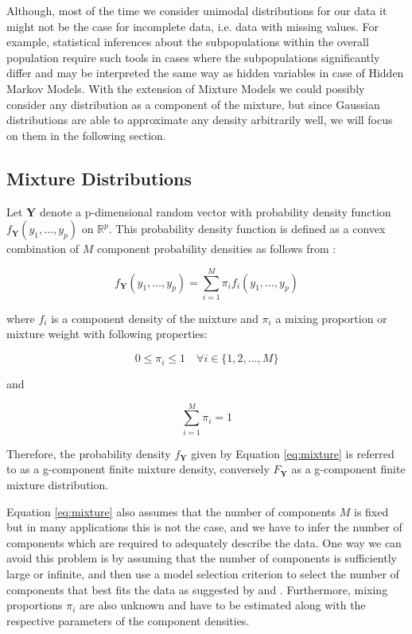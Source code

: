 Although, most of the time we consider unimodal distributions for our data it might not be the case for incomplete data, i.e. data with missing values.
For example, statistical inferences about the subpopulations within the overall population require such tools in cases where the subpopulations significantly differ 
and may be interpreted the same way as hidden variables in case of Hidden Markov Models. With the extension of Mixture Models we could possibly consider any
distribution as a component of the mixture, but since Gaussian distributions are able to approximate any density arbitrarily well, we will focus on them in the following section.

\subsection{Mixture Distributions}

Let $\textbf{Y}$ denote a p-dimensional random vector with probability density function $f_{\textbf{Y}}(y_1,\ldots,y_p)$ on $\mathbb{R}^p$. 
This probability density function is defined as a convex combination of $M$ component probability densities as follows from \citep{McLachlan2000}: 

\begin{equation} \label{eq:mixture}
    f_{\textbf{Y}}(y_1,\ldots,y_p) = \sum_{i=1}^{M} \pi_i f_i(y_1,\ldots,y_p)
\end{equation}

where $f_i$ is a component density of the mixture and $\pi_i$ a mixing proportion or mixture weight with following properties:

\begin{equation}
    0 \leq \pi_i \leq 1 \quad \forall i \in \{1,2,\ldots,M\}
\end{equation}

and

\begin{equation}
    \sum_{i=1}^{M} \pi_i = 1
\end{equation}

Therefore, the probability density $f_{\textbf{Y}}$ given by Equation \ref{eq:mixture} is referred to as a g-component finite mixture density, conversely $F_{\textbf{Y}}$ 
as a g-component finite mixture distribution. 

Equation \ref{eq:mixture} also assumes that the number of components $M$ is fixed but in many applications this is not the case, and we have to infer 
the number of components which are required to adequately describe the data. One way we can avoid this problem is by assuming that the number of components is 
sufficiently large or infinite, and then use a model selection criterion to select the number of components that best fits the data as suggested by \citep{Sammut2011} and \citep{Rasmussen1999}.
Furthermore, mixing proportions $\pi_i$ are also unknown and have to be estimated along with the respective parameters of the component densities.

